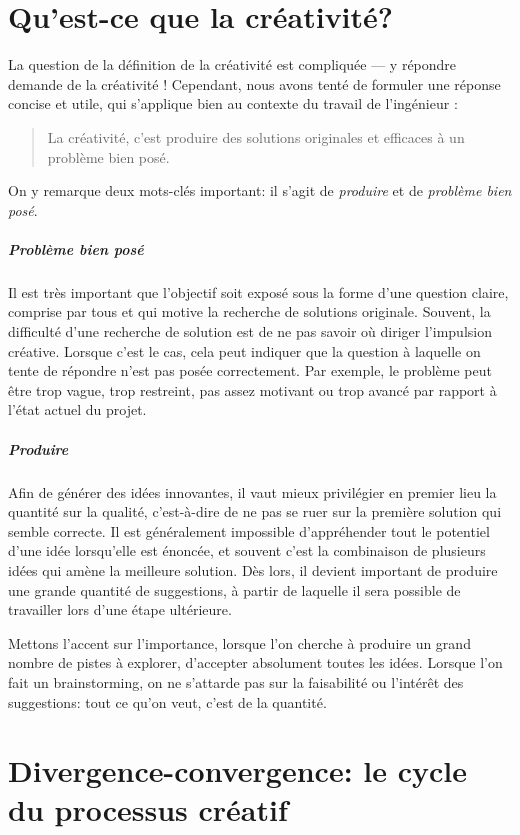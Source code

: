 \documentclass[a4paper,12pt, oneside]{article}
\begin{document}
\section{Qu'est-ce que la créativité?}

La question de la définition de la créativité est compliquée --- y répondre demande de la créativité ! Cependant, nous avons tenté de formuler une réponse concise et utile, qui s'applique bien au contexte du travail de l'ingénieur :
\begin{quote}
    La créativité, c'est produire des solutions originales et efficaces à un problème bien posé.
\end{quote}
On y remarque deux mots-clés important: il s'agit de \emph{produire} et de \emph{problème bien posé}.

\subparagraph{Problème bien posé} Il est très important que l'objectif soit exposé sous la forme d'une question claire, comprise par tous et qui motive la recherche de solutions originale. Souvent, la difficulté d'une recherche de solution est de ne pas savoir où diriger l'impulsion créative. Lorsque c'est le cas, cela peut indiquer que la question à laquelle on tente de répondre n'est pas posée correctement. Par exemple, le problème peut être trop vague, trop restreint, pas assez motivant ou trop avancé par rapport à l'état actuel du projet.

\subparagraph{Produire} Afin de générer des idées innovantes, il vaut mieux privilégier en premier lieu la quantité sur la qualité, c'est-à-dire de ne pas se ruer sur la première solution qui semble correcte. Il est généralement impossible d'appréhender tout le potentiel d'une idée lorsqu'elle est énoncée, et souvent c'est la combinaison de plusieurs idées qui amène la meilleure solution\footnotemark. Dès lors, il devient important de produire une grande quantité de suggestions, à partir de laquelle il sera possible de travailler lors d'une étape ultérieure.


Mettons l'accent sur l'importance, lorsque l'on cherche à produire un grand nombre de pistes à explorer, d'accepter absolument toutes les idées. Lorsque l'on fait un brainstorming, on ne s'attarde pas sur la faisabilité ou l'intérêt des suggestions: tout ce qu'on veut, c'est de la quantité.

\section{Divergence-convergence: le cycle du processus créatif}
\end{document}
